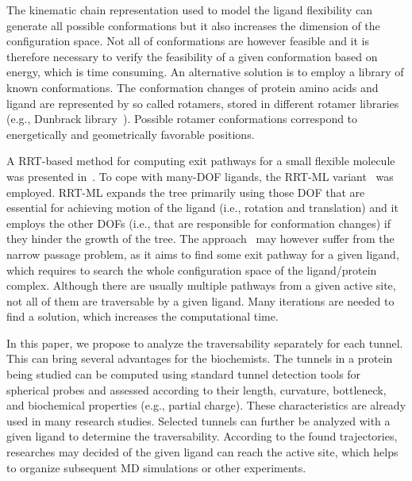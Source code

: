 \documentclass[letterpaper, 10 pt, conference]{ieeeconf} %
\begin{document}
The kinematic chain representation used to model the ligand flexibility can generate all possible conformations but it also increases the dimension of the configuration space.
Not all of conformations are however feasible and it is therefore necessary to verify the feasibility of a given conformation based on energy, which is time consuming.
An alternative solution is to employ a library of known conformations.
The conformation changes of protein amino acids and ligand are represented by so called rotamers, stored in different rotamer libraries (e.g., Dunbrack library~\cite{dunbrack}).
Possible rotamer conformations correspond to energetically and geometrically favorable positions.


A RRT-based method for computing exit pathways for a small flexible molecule was presented in~\cite{cortes2010simulating}.
To cope with many-DOF ligands, the RRT-ML variant~\cite{cortes2007mlrrt} was employed.
RRT-ML expands the tree primarily using those DOF that are essential for achieving motion of the ligand (i.e., rotation
and translation) and it employs the other DOFs (i.e., that are responsible for conformation changes) if they hinder the growth of the tree.
The approach~\cite{cortes2010simulating} may however suffer from the narrow passage problem, as it aims to find some exit pathway for a given ligand, which requires to search the whole configuration space of the ligand/protein complex.
Although there are usually multiple pathways from a given active site, not all of them are traversable by a given ligand.
Many iterations are needed to find a solution, which increases the computational time.

In this paper, we propose to analyze the traversability separately for each tunnel.
This can bring several advantages for the biochemists.
The tunnels in a protein being studied can be computed using standard tunnel detection tools for spherical probes and assessed
according to their length, curvature, bottleneck, and biochemical properties (e.g., partial charge).
These characteristics are already used in many research studies.
Selected tunnels can further be analyzed with a given ligand to determine the traversability.
According to the found trajectories, researches may decided of the given ligand can reach the active site, which helps to 
organize subsequent MD simulations or other experiments.
\end{document}
